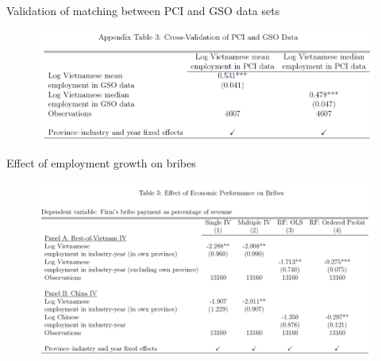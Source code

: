 \documentclass{beamer}
\begin{document}
\begin{frame}{Validation of matching between PCI and GSO data sets}

\begin{figure}
\centering
\includegraphics[width=1\linewidth]{10.png}
\end{figure}

\end{frame}

\begin{frame}{Effect of employment growth on bribes}

\begin{figure}
\centering
\includegraphics[width=1\linewidth]{11.png}
\end{figure}

\end{frame}
\end{document}
